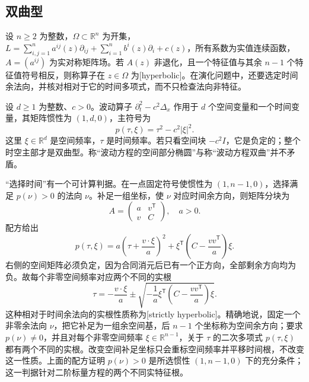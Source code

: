 \subsection{双曲型}
\label{b2:subsec:080202}

\begin{definition}\label{b2:def:08-hyperbolic}
设 \(n\geq2\) 为整数，\(\Omega\subset\mathbb R^n\) 为开集，\(L=\sum_{i,j=1}^n a^{ij}(z)\partial_{ij}+\sum_{i=1}^n b^i(z)\partial_i+c(z)\)，所有系数为实值连续函数，\(A=(a^{ij})\) 为实对称矩阵场。若 \(A(z)\) 非退化，且一个特征值与其余 \(n-1\) 个特征值符号相反，则称算子在 \(z\in\Omega\) 为[hyperbolic]。在演化问题中，还要选定时间余法向，并核对相对于它的时间多项式，而不只检查法向非特征。
\end{definition}

设 \(d\geq1\) 为整数、\(c>0\)。波动算子 \(\partial_t^2-c^2\Delta_x\) 作用于 \(d\) 个空间变量和一个时间变量，其矩阵惯性为 \((1,d,0)\)，主符号为
\[
 p(\tau,\xi)=\tau^2-c^2|\xi|^2.
\]
这里 \(\xi\in\mathbb R^d\) 是空间频率，\(\tau\) 是时间频率。若只看空间块 \(-c^2I\)，它是负定的；整个时空主部才是双曲型。称“波动方程的空间部分椭圆”与称“波动方程双曲”并不矛盾。

\ProseParagraphBreak

“选择时间”有一个可计算判据。在一点固定符号使惯性为 \((1,n-1,0)\)，选择满足 \(p(\nu)>0\) 的法向 \(\nu\)。补足一组坐标，使 \(\nu\) 对应时间余方向，则矩阵分块为
\[
 A=\begin{pmatrix}a&v^{\mathsf T}\\v&C\end{pmatrix},\quad a>0.
\]
配方给出
\begin{equation}\label{b2:eq:08-hyperbolic-square}
 p(\tau,\xi)=a\left(\tau+\frac{v\cdot\xi}{a}\right)^2
 +\xi^{\mathsf T}\left(C-\frac{vv^{\mathsf T}}{a}\right)\xi.
\end{equation}
右侧的空间矩阵必须负定，因为合同消元后已有一个正方向，全部剩余方向均为负。故每个非零空间频率对应两个不同的实根
\[
 \tau=-\frac{v\cdot\xi}{a}
 \pm\sqrt{-\frac1a\xi^{\mathsf T}\left(C-\frac{vv^{\mathsf T}}{a}\right)\xi}.
\]
这种相对于时间余法向的实根性质称为[strictly hyperbolic]。精确地说，固定一个非零余法向 \(\nu\)，把它补足为一组余空间基，后 \(n-1\) 个坐标称为空间余方向；要求 \(p(\nu)\ne0\)，并且对每个非零空间频率 \(\xi\in\mathbb R^{n-1}\)，关于 \(\tau\) 的二次多项式 \(p(\tau,\xi)\) 都有两个不同的实根。改变空间补足坐标只会重标空间频率并平移时间根，不改变这一性质。上面的配方证明 \(p(\nu)>0\) 是所选惯性 \((1,n-1,0)\) 下的充分条件；这一判据针对二阶标量方程的两个不同实特征根。

